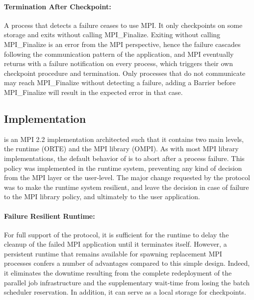 \paragraph*{Termination After Checkpoint:} A process that detects a
failure ceases to use MPI. It only checkpoints on some storage and exits
without calling MPI\_Finalize. Exiting without calling MPI\_Finalize is
an error from the MPI perspective, hence the failure cascades following
the communication pattern of the application, and MPI eventually returns
with a failure notification on every process, which triggers their own
checkpoint procedure and termination. Only processes that do not
communicate may reach MPI\_Finalize without detecting a failure, adding
a Barrier before MPI\_Finalize will result in the expected error in that
case.

\subsection{\ompi Implementation\label{sec:mpi}}

\ompi is an MPI 2.2 implementation architected such that it contains two
main levels, the runtime (ORTE) and the MPI library (OMPI). As with most
MPI library implementations, the default behavior of \ompi is to abort
after a process failure. This policy was implemented in the runtime
system, preventing any kind of decision from the MPI layer or the
user-level. The major change requested by the \cof protocol was to make the
runtime system resilient, and leave the decision in case of failure to
the MPI library policy, and ultimately to the user application.

\paragraph*{Failure Resilient Runtime:} For full support of the \cof
protocol, it is sufficient for the runtime to delay the cleanup of the
failed MPI application until it terminates itself. However, a persistent
runtime that remains available for spawning replacement MPI processes
confers a number of advantages compared to this simple design. Indeed,
it eliminates the downtime resulting from the complete redeployment of
the parallel job infrastructure and the supplementary wait-time from
losing the batch scheduler reservation. In addition, it can serve as a
local storage for checkpoints.

